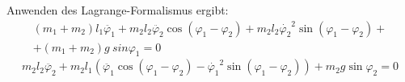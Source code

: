 \documentclass[compress,11pt]{beamer}
\begin{document}

\begin{frame}
	\begin{block}{Anwenden des Lagrange-Formalismus ergibt:}
		\small		
		\begin{equation}
		\begin{split}
			(m_1 + m_2) l_1\ddot{\varphi_1} + m_2 l_2 \ddot{\varphi_2} \cos (\varphi_1 - \varphi_2) + m_2 l_2 \dot{\varphi_2}^2 \sin (\varphi_1 - \varphi_2) +\\+ (m_1 + m_2) g \ sin \varphi_1 = 0
\end{split}
\end{equation}
\begin{equation}
m_2 l_2 \ddot{\varphi_2} + m_2 l_1 (\ddot{\varphi_1} \cos (\varphi_1 - \varphi_2) - \dot{\varphi_1}^2 \sin (\varphi_1 - \varphi_2)) + m_2 g \sin \varphi_2 = 0
		\end{equation}
	\end{block}
\end{frame}

\begin{frame}
\end{frame}
\end{document}
